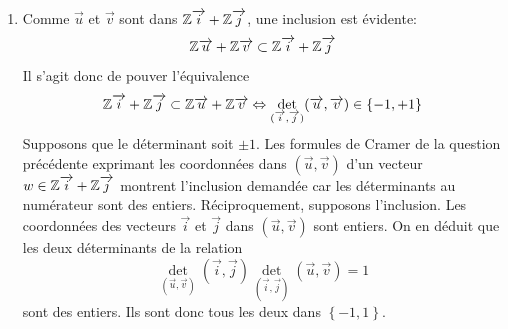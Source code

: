 \begin{enumerate}
 \item Comme $\overrightarrow{u}$ et $\overrightarrow{v}$ sont dans $\mathbb{Z}\overrightarrow{i} + \mathbb{Z}\overrightarrow{j}$, une inclusion est évidente:
 \begin{displaymath}
   \mathbb{Z}\overrightarrow{u} + \mathbb{Z}\overrightarrow{v} \subset \mathbb{Z}\overrightarrow{i} + \mathbb{Z}\overrightarrow{j}
 \end{displaymath}
Il s'agit donc de pouver l'équivalence
 \begin{displaymath}
   \mathbb{Z}\overrightarrow{i} + \mathbb{Z}\overrightarrow{j} \subset \mathbb{Z}\overrightarrow{u} + \mathbb{Z}\overrightarrow{v}
   \Leftrightarrow \det_{(\overrightarrow{i},\overrightarrow{j})}(\overrightarrow{u},\overrightarrow{v})\in\left\lbrace -1, +1\right\rbrace 
 \end{displaymath}
Supposons que le déterminant soit $\pm1$.\newline
Les formules de Cramer de la question précédente exprimant les coordonnées dans $(\overrightarrow{u},\overrightarrow{v})$ d'un vecteur $w\in \mathbb{Z}\overrightarrow{i} + \mathbb{Z}\overrightarrow{j}$ montrent l'inclusion demandée car les déterminants au numérateur sont des entiers.\newline
Réciproquement, supposons l'inclusion.\newline
Les coordonnées des vecteurs $\overrightarrow{i}$ et $\overrightarrow{j}$ dans $(\overrightarrow{u},\overrightarrow{v})$ sont entiers. On en déduit que les deux déterminants de la relation
 \begin{displaymath}
   \det_{(\overrightarrow{u},\overrightarrow{v})}(\overrightarrow{i},\overrightarrow{j})
   \det_{(\overrightarrow{i},\overrightarrow{j})}(\overrightarrow{u},\overrightarrow{v}) = 1
 \end{displaymath}
sont des entiers. Ils sont donc tous les deux dans $\left\lbrace -1, 1\right\rbrace$.
\end{enumerate}

